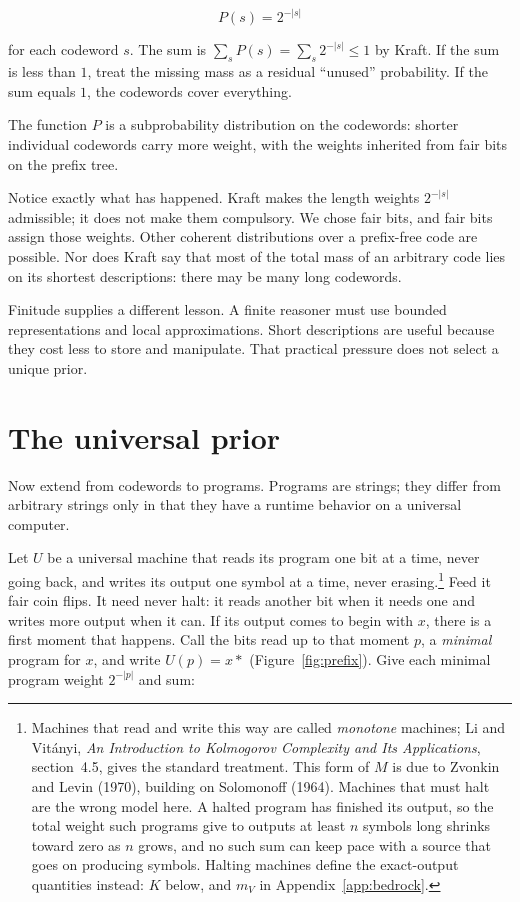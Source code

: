 $$P(s) = 2^{-|s|}$$

for each codeword $s$. The sum is $\sum_s P(s) = \sum_s 2^{-|s|} \leq 1$ by Kraft. If the sum is less than $1$, treat the missing mass as a residual ``unused'' probability. If the sum equals $1$, the codewords cover everything.

The function $P$ is a subprobability distribution on the codewords: shorter individual codewords carry more weight, with the weights inherited from fair bits on the prefix tree.

Notice exactly what has happened. Kraft makes the length weights $2^{-|s|}$ admissible; it does not make them compulsory. We chose fair bits, and fair bits assign those weights. Other coherent distributions over a prefix-free code are possible. Nor does Kraft say that most of the total mass of an arbitrary code lies on its shortest descriptions: there may be many long codewords.

Finitude supplies a different lesson. A finite reasoner must use bounded representations and local approximations. Short descriptions are useful because they cost less to store and manipulate. That practical pressure does not select a unique prior.

\section*{The universal prior}

Now extend from codewords to programs. Programs are strings; they differ from arbitrary strings only in that they have a runtime behavior on a universal computer.

Let $U$ be a universal machine that reads its program one bit at a time, never going back, and writes its output one symbol at a time, never erasing.\footnote{Machines that read and write this way are called \emph{monotone} machines; Li and Vit\'anyi, \textit{An Introduction to Kolmogorov Complexity and Its Applications}, section~4.5, gives the standard treatment. This form of $M$ is due to Zvonkin and Levin (1970), building on Solomonoff (1964). Machines that must halt are the wrong model here. A halted program has finished its output, so the total weight such programs give to outputs at least $n$ symbols long shrinks toward zero as $n$ grows, and no such sum can keep pace with a source that goes on producing symbols. Halting machines define the exact-output quantities instead: $K$ below, and $m_V$ in Appendix~\ref{app:bedrock}.} Feed it fair coin flips. It need never halt: it reads another bit when it needs one and writes more output when it can. If its output comes to begin with $x$, there is a first moment that happens. Call the bits read up to that moment $p$, a \emph{minimal} program for $x$, and write $U(p) = x{*}$ (Figure~\ref{fig:prefix}). Give each minimal program weight $2^{-|p|}$ and sum:

